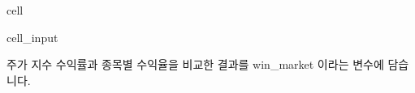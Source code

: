 \documentclass[letterpaper,10pt,english]{jupyterBook}
\begin{document}
\begin{sphinxuseclass}{cell}\begin{sphinxVerbatimInput}

\begin{sphinxuseclass}{cell_input}
\begin{sphinxVerbatim}[commandchars=\\\{\}]
\end{sphinxVerbatim}

\end{sphinxuseclass}\end{sphinxVerbatimInput}

\end{sphinxuseclass}
\sphinxAtStartPar
 주가 지수 수익률과 종목별 수익율을 비교한 결과를 win\_market 이라는 변수에 담습니다.
\end{document}
